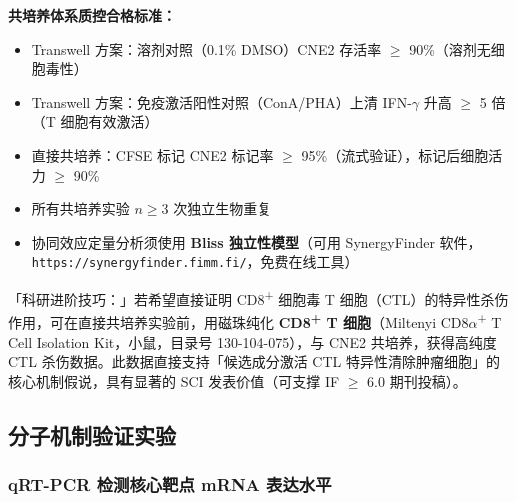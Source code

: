 \documentclass[12pt,a4paper,twoside]{article}
\begin{document}
\begin{qcbox}
\textbf{共培养体系质控合格标准：}
\begin{itemize}
  \item Transwell 方案：溶剂对照（0.1\% DMSO）CNE2 存活率 $\geq$ 90\%（溶剂无细胞毒性）
  \item Transwell 方案：免疫激活阳性对照（ConA/PHA）上清 IFN-$\gamma$ 升高 $\geq$ 5 倍（T 细胞有效激活）
  \item 直接共培养：CFSE 标记 CNE2 标记率 $\geq$ 95\%（流式验证），标记后细胞活力 $\geq$ 90\% 
  \item 所有共培养实验 $n \geq 3$ 次独立生物重复 
  \item 协同效应定量分析须使用 \textbf{Bliss 独立性模型}（可用 SynergyFinder 软件，\texttt{https://synergyfinder.fimm.fi/}，免费在线工具）
\end{itemize}
\end{qcbox}

\begin{tipbox}
「科研进阶技巧：」若希望直接证明 CD8\textsuperscript{+} 细胞毒 T 细胞（CTL）的特异性杀伤作用，可在直接共培养实验前，用磁珠纯化 \textbf{CD8\textsuperscript{+} T 细胞}（Miltenyi CD8$\alpha$\textsuperscript{+} T Cell Isolation Kit，小鼠，目录号 130-104-075），与 CNE2 共培养，获得高纯度 CTL 杀伤数据。此数据直接支持「候选成分激活 CTL 特异性清除肿瘤细胞」的核心机制假说，具有显著的 SCI 发表价值（可支撑 IF $\geq$ 6.0 期刊投稿）。
\end{tipbox}

\subsection{分子机制验证实验}
\label{sec:module6_mechanism}

\subsubsection{qRT-PCR 检测核心靶点 mRNA 表达水平}
\end{document}
